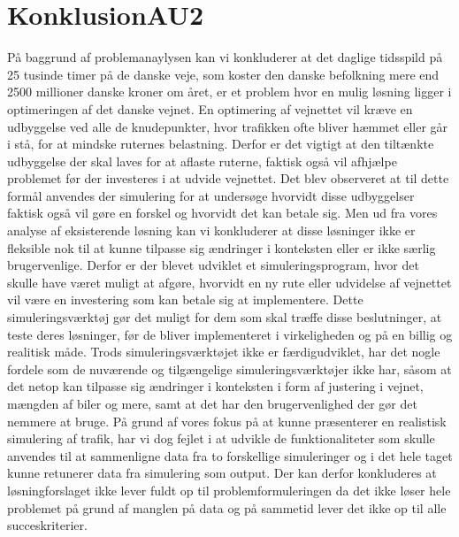 \chapter{KonklusionAU2}
På baggrund af problemanaylysen kan vi konkluderer at 
det daglige tidsspild på 25 tusinde timer på de danske veje, som koster den danske befolkning mere end
2500 millioner danske kroner om året, er et problem hvor en mulig løsning ligger i optimeringen af det
danske vejnet. En optimering af vejnettet vil kræve en udbyggelse ved alle de knudepunkter, hvor trafikken
ofte bliver hæmmet eller går i stå, for at mindske ruternes belastning. Derfor er det vigtigt at den tiltænkte udbyggelse der skal laves for at aflaste ruterne, faktisk også vil afhjælpe problemet før der investeres i at udvide vejnettet. Det blev observeret at til dette formål anvendes der simulering for at undersøge hvorvidt disse udbyggelser faktisk også vil gøre en forskel og hvorvidt det
kan betale sig. Men ud fra vores analyse af eksisterende løsning kan vi konkluderer at disse løsninger ikke er fleksible nok til at kunne tilpasse sig ændringer i konteksten eller er ikke særlig brugervenlige. Derfor er der blevet udviklet et simuleringsprogram, hvor det skulle have været muligt at afgøre, hvorvidt en ny rute eller udvidelse af vejnettet vil være en investering som kan betale sig at implementere. Dette simuleringsværktøj gør det muligt for dem som skal træffe disse beslutninger, at teste deres løsninger, før de bliver implementeret i virkeligheden og på en billig og realitisk måde. Trods simuleringsværktøjet ikke er færdigudviklet, har det nogle fordele som de nuværende og tilgængelige  simuleringsværktøjer ikke har, såsom at det netop kan tilpasse sig ændringer i konteksten i form af justering i vejnet, mængden af biler og mere, samt at det har den brugervenlighed der gør det nemmere at bruge. På grund af vores fokus på at kunne præsenterer en realistisk simulering af trafik, har vi dog fejlet i at udvikle de funktionaliteter som skulle anvendes til at sammenligne data fra to forskellige simuleringer og i det hele taget kunne retunerer data fra simulering som output. Der kan derfor konkluderes at løsningforslaget ikke lever fuldt op til problemformuleringen da det ikke løser hele problemet på grund af manglen på data og på sammetid lever det ikke op til alle succeskriterier. 